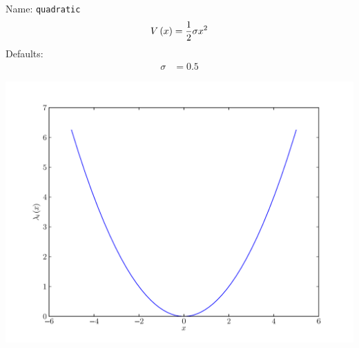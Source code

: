 \documentclass[a4paper,10pt]{report}
\begin{document}
\begin{minipage}{0.5\linewidth}
  Name:    \texttt{quadratic}
  \begin{equation*}
    V\left( x \right) = \frac{1}{2} \sigma x^{2}
  \end{equation*}
  Defaults:
  \begin{align*}
    \sigma & = 0.5
  \end{align*}
\end{minipage}
\begin{minipage}{0.5\linewidth}
  \begin{center}
    \includegraphics[scale=0.25]{./fig/quadratic.pdf}
  \end{center}
\end{minipage}
\end{document}
